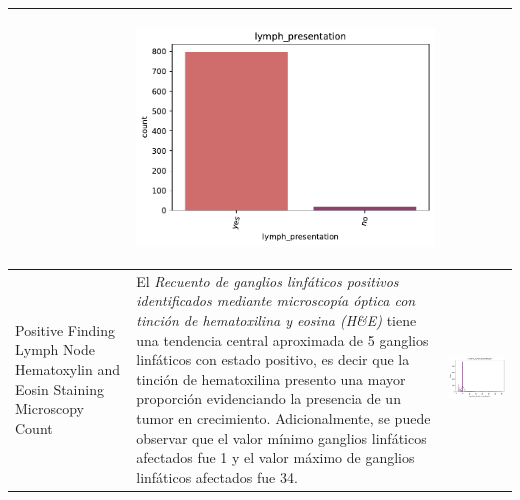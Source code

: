\begin{table}[!htb]
\begin{threeparttable}
\begin{tabular}{p{2.5cm} p{7cm} p{6.5cm}}
			& \begin{center}\includegraphics[width=1\linewidth]{NOTEBOOK/IMAGENES_DESCRIPTIVAS/22_lymph_presentation}\end{center}
			\\ \hline
			
			Positive Finding Lymph Node Hematoxylin and Eosin Staining Microscopy Count
			& El \textit{Recuento de ganglios linfáticos positivos identificados mediante microscopía óptica con tinción de hematoxilina y eosina (H\&E)} tiene una tendencia central aproximada de 5 ganglios linfáticos con estado positivo, es decir que la tinción de hematoxilina presento una mayor proporción evidenciando la presencia de un tumor en crecimiento. Adicionalmente, se puede observar que el valor mínimo ganglios linfáticos afectados fue 1 y el valor máximo de ganglios linfáticos afectados fue 34. 
			& \begin{center}\includegraphics[width=1\linewidth]{NOTEBOOK/IMAGENES_DESCRIPTIVAS/23_positive_lymph_hematoxylin}\end{center}
			\\ \hline
		\end{tabular}
	\end{threeparttable}
\end{table}

